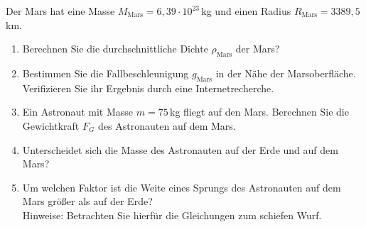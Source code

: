 \begin{ExerciseBlock}
Der Mars hat eine Masse $M_\text{Mars} = 6,39 \cdot 10^{23}\,$kg und einen Radius $R_\text{Mars} = 3389,5 \,$km.

\begin{enumerate}
	\item Berechnen Sie die durchschnittliche Dichte $\rho_\text{Mars}$ der Mars?

	\item Bestimmen Sie die Fallbeschleunigung $g_\text{Mars}$ in der Nähe der Marsoberfläche. Verifizieren Sie ihr Ergebnis durch eine Internetrecherche.

	\item Ein Astronaut mit Masse $m=75\,$kg fliegt auf den Mars. Berechnen Sie die Gewichtkraft $F_G$ des Astronauten auf dem Mars.

	\item Unterscheidet sich die Masse des Astronauten auf der Erde und auf dem Mars?

	\item Um welchen Faktor ist die Weite eines Sprungs des Astronauten auf dem Mars größer als auf der Erde? \\ Hinweise: Betrachten Sie hierfür die Gleichungen zum schiefen Wurf.

\end{enumerate}
\end{ExerciseBlock}
